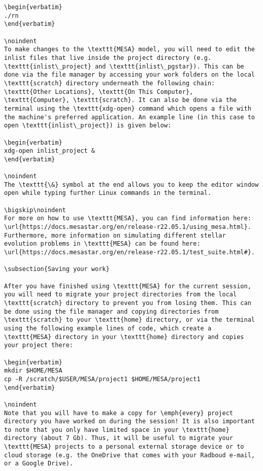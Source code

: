 \documentclass[11pt,a4paper]{article}
\begin{document}
\begin{lstlisting}
\begin{verbatim}
./rn
\end{verbatim}

\noindent
To make changes to the \texttt{MESA} model, you will need to edit the inlist files that live inside the project directory (e.g. \texttt{inlist\_project} and \texttt{inlist\_pgstar}). This can be done via the file manager by accessing your work folders on the local \texttt{scratch} directory underneath the following chain: \texttt{Other Locations}, \texttt{On This Computer}, \texttt{Computer}, \texttt{scratch}. It can also be done via the terminal using the \texttt{xdg-open} command which opens a file with the machine's preferred application. An example line (in this case to open \texttt{inlist\_project}) is given below:

\begin{verbatim}
xdg-open inlist_project &
\end{verbatim}

\noindent
The \texttt{\&} symbol at the end allows you to keep the editor window open while typing further Linux commands in the terminal.

\bigskip\noindent
For more on how to use \texttt{MESA}, you can find information here: \url{https://docs.mesastar.org/en/release-r22.05.1/using_mesa.html}. Furthermore, more information on simulating different stellar evolution problems in \texttt{MESA} can be found here: \url{https://docs.mesastar.org/en/release-r22.05.1/test_suite.html#}.

\subsection{Saving your work}

After you have finished using \texttt{MESA} for the current session, you will need to migrate your project directories from the local \texttt{scratch} directory to prevent you from losing them. This can be done using the file manager and copying directories from \texttt{scratch} to your \texttt{home} directory, or via the terminal using the following example lines of code, which create a \texttt{MESA} directory in your \texttt{home} directory and copies your project there:

\begin{verbatim}
mkdir $HOME/MESA
cp -R /scratch/$USER/MESA/project1 $HOME/MESA/project1
\end{verbatim}

\noindent
Note that you will have to make a copy for \emph{every} project directory you have worked on during the session! It is also important to note that you only have limited space in your \texttt{home} directory (about 7 Gb). Thus, it will be useful to migrate your \texttt{MESA} projects to a personal external storage device or to cloud storage (e.g. the OneDrive that comes with your Radboud e-mail, or a Google Drive). 



\end{lstlisting}
\end{document}
